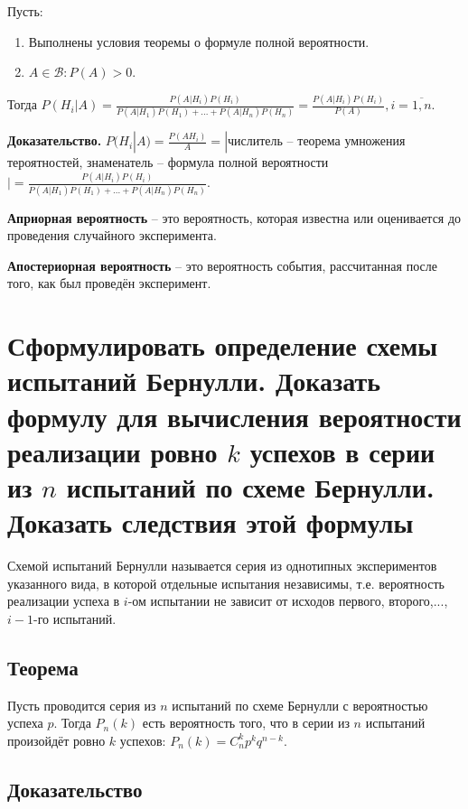 Пусть: 
\begin{enumerate}
	\item Выполнены условия теоремы о формуле полной вероятности.
	\item $A \in \mathcal{B}: P(A) > 0$.
\end{enumerate}
Тогда $P(H_i|A) = \frac{P(A|H_i)P(H_i)}{P(A|H_1)P(H_1)+...+P(A|H_n)P(H_n)} = \frac{P(A|H_i)P(H_i)}{P(A)}, i = \overline{1, n}$.

\textbf{Доказательство.} $P(H_i|A) = \frac{P(AH_i)}{A} = |$числитель -- теорема умножения тероятностей, знаменатель -- формула полной вероятности$|=\frac{P(A|H_i)P(H_i)}{P(A|H_1)P(H_1)+...+P(A|H_n)P(H_n)}$.

\textbf{Априорная вероятность} -- это вероятность, которая известна или оценивается до проведения случайного эксперимента.

\textbf{Апостериорная вероятность} -- это вероятность события, рассчитанная после того, как был проведён эксперимент. 

\section{Сформулировать определение схемы испытаний Бернулли. Доказать формулу для вычисления вероятности реализации ровно $k$ успехов в серии из $n$ испытаний по схеме Бернулли. Доказать следствия этой формулы}

Схемой испытаний Бернулли называется серия из однотипных экспериментов указанного вида, в которой отдельные испытания независимы, т.е. вероятность реализации успеха в $i$-ом испытании не зависит от исходов первого,
второго,...,$i-1$-го испытаний.

\subsection*{Теорема}

Пусть проводится серия из $n$ испытаний по схеме Бернулли с вероятностью успеха $p$. Тогда $P_n(k)$ есть вероятность того, что в серии из $n$ испытаний произойдёт ровно $k$ успехов: $P_n(k) = C_n^kp^kq^{n-k}$.

\subsection*{Доказательство}

